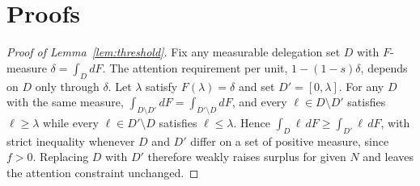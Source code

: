 \documentclass[11pt,a4paper]{article}
\makeatletter
\renewcommand\@seccntformat[1]{\csname the#1\endcsname.\quad}
\theoremstyle{plain}
\makeatother
\begin{document}
\appendix
\renewcommand{\thesection}{Appendix \Alph{section}}
\makeatletter
\renewcommand\@seccntformat[1]{\csname the#1\endcsname.\quad}
\makeatother

\section{Proofs}

\begin{proof}[Proof of Lemma~\ref{lem:threshold}]
Fix any measurable delegation set $D$ with $F$-measure $\delta = \int_D dF$. The attention requirement per unit, $1 - (1-s)\delta$, depends on $D$ only through $\delta$. Let $\lambda$ satisfy $F(\lambda) = \delta$ and set $D' = [0, \lambda]$. For any $D$ with the same measure, $\int_{D \setminus D'} dF = \int_{D' \setminus D} dF$, and every $\ell \in D \setminus D'$ satisfies $\ell \ge \lambda$ while every $\ell \in D' \setminus D$ satisfies $\ell \le \lambda$. Hence $\int_D \ell \, dF \ge \int_{D'} \ell \, dF$, with strict inequality whenever $D$ and $D'$ differ on a set of positive measure, since $f > 0$. Replacing $D$ with $D'$ therefore weakly raises surplus for given $N$ and leaves the attention constraint unchanged.
\end{proof}
\end{document}
